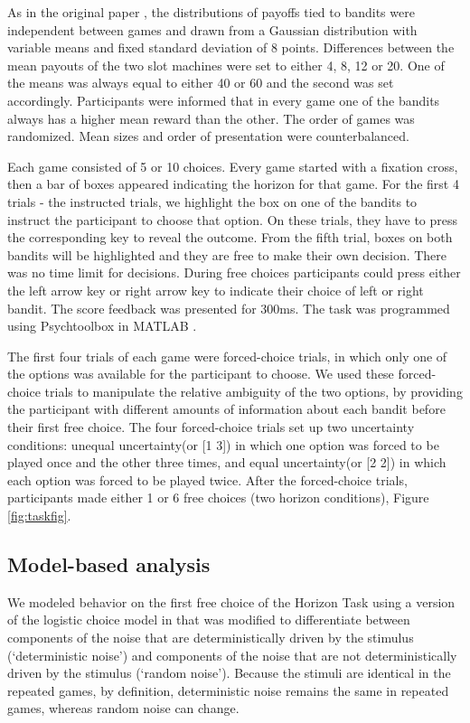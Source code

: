 \documentclass[12pt]{article}
\begin{document}
	As in the original paper \citep{wilson2014}, the distributions of payoffs tied to bandits were independent between games and drawn from a Gaussian distribution with variable means and fixed standard deviation of 8 points. Differences between the mean payouts of the two slot machines were set to either 4, 8, 12 or 20. One of the means was always equal to either 40 or 60 and the second was set accordingly. Participants were informed that in every game one of the bandits always has a higher mean reward than the other. The order of games was randomized. Mean sizes and order of presentation were counterbalanced. 
	
	Each game consisted of 5 or 10 choices. Every game started with a fixation cross, then a bar of boxes appeared indicating the horizon for that game. For the first 4 trials - the instructed trials, we highlight the box on one of the bandits to instruct the participant to choose that option. On these trials, they have to press the corresponding key to reveal the outcome. From the fifth trial, boxes on both bandits will be highlighted and they are free to make their own decision. There was no time limit for decisions. During free choices participants could press either the left arrow key or right arrow key to indicate their choice of left or right bandit. The score feedback was presented for 300ms. The task was programmed using Psychtoolbox in MATLAB \citep{psychtoolbox1, psychtoolbox2}. 
	
	The first four trials of each game were forced-choice trials, in which only one of the options was available for the participant to choose. We used these forced-choice trials to manipulate the relative ambiguity of the two options, by providing the participant with different amounts of information about each bandit before their first free choice. The four forced-choice trials set up two uncertainty conditions: unequal uncertainty(or [1 3]) in which one option was forced to be played once and the other three times, and equal uncertainty(or [2 2]) in which each option was forced to be played twice. After the forced-choice trials, participants made either 1 or 6 free choices (two horizon conditions),  Figure \ref{fig:taskfig}.
	
	\subsection*{Model-based analysis}
	We modeled behavior on the first free choice of the Horizon Task using a version of the logistic choice model in \citep{wilson2014} that was modified to differentiate between components of the noise that are deterministically driven by the stimulus (`deterministic noise') and components of the noise that are not deterministically driven by the stimulus (`random noise').  Because the stimuli are identical in the repeated games, by definition, deterministic noise remains the same in repeated games, whereas random noise can change. 
	
\end{document}
